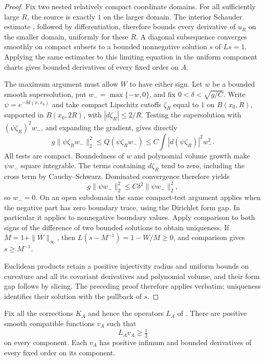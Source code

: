 \begin{proof}
Fix two nested relatively compact coordinate domains.  For all
sufficiently large $R$, the source is exactly $1$ on the larger domain.
The interior Schauder estimate
\citep[Lecture~12, Theorem~2]{simonPDE}, followed by differentiation,
therefore bounds every derivative of $u_R$ on the smaller domain,
uniformly for these $R$.  A diagonal subsequence converges smoothly
on compact subsets to a bounded nonnegative solution $s$ of $Ls=1$.
Applying the same estimates to this limiting equation in the uniform
component charts gives bounded derivatives of every fixed order on $A$.

The maximum argument must allow $W$ to have either sign.  Let $w$ be
a bounded smooth supersolution, put $w_-=\max\{-w,0\}$, and fix
$0<\delta<\sqrt{g/C}$.  Write
$\psi=e^{-\delta d(x,x_0)}$ and take compact Lipschitz cutoffs
$\zeta_R$ equal to $1$ on $B(x_0,R)$, supported in $B(x_0,2R)$,
with $|d\zeta_R|\le 2/R$.  Testing the supersolution with
$(\psi\zeta_R)^2w_-$, and expanding the gradient, gives directly
\[
 g\|\psi\zeta_R w_-\|_2^2
 \le Q(\psi\zeta_R w_-)
 \le C\int |d(\psi\zeta_R)|^2w_-^2.
\]
All tests are compact.  Boundedness of $w$ and polynomial volume growth make
$\psi w_-$ square integrable.  The terms containing $d\zeta_R$ tend
to zero, including the cross term by Cauchy--Schwarz.  Dominated
convergence therefore yields
\[
 g\|\psi w_-\|_2^2\le C\delta^2\|\psi w_-\|_2^2,
\]
so $w_-=0$.  On an open subdomain the same compact-test argument
applies when the negative part has zero boundary trace, using the
Dirichlet form gap.  In particular it applies to nonnegative boundary
values.  Apply comparison to both signs of the difference of two
bounded solutions to obtain uniqueness.  If $M=1+\|W\|_\infty$, then
$L(s-M^{-1})=1-W/M\ge0$, and comparison gives $s\ge M^{-1}$.

Euclidean products retain a positive injectivity radius and uniform bounds on curvature and all its covariant derivatives and polynomial volume,
and their form gap follows by slicing.  The preceding proof therefore
applies verbatim; uniqueness identifies their solution with the
pullback of $s$.
\end{proof}

\begin{lemma}\label{regular:solutions}
Fix all the corrections $K_A$ and hence the operators $L_A$ of
. There are positive smooth compatible
functions $v_A$ such that
\begin{equation}\label{regular:strict-supersolution}
 L_Av_A\ge\tfrac12
\end{equation}
on every component. Each $v_A$ has positive infimum and bounded
derivatives of every fixed order on its component.
\end{lemma}


